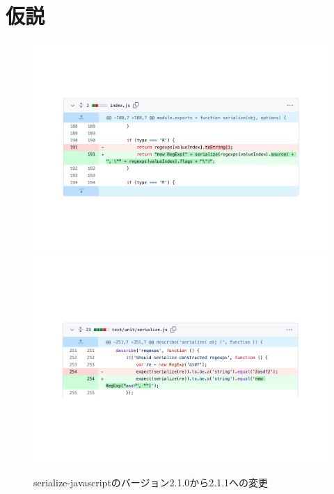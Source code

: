 \documentclass[submit]{ipsj}
\begin{document}
\vspace{-2mm}
\section{仮説}
\label{sec:hypothesis}

\begin{figure}[t]
  \centering
\includegraphics[width=1.0\linewidth]{IPSJjournal_maekawa_fig/rq1/serialize-javascript/index.pdf}
\includegraphics[width=1.0\linewidth]{IPSJjournal_maekawa_fig/rq1/serialize-javascript/index.test.pdf}
  \caption{serialize-javascriptのバージョン2.1.0から2.1.1への変更}
  \label{fig:motivation}
  \vspace{-4mm}
\end{figure}
\end{document}
